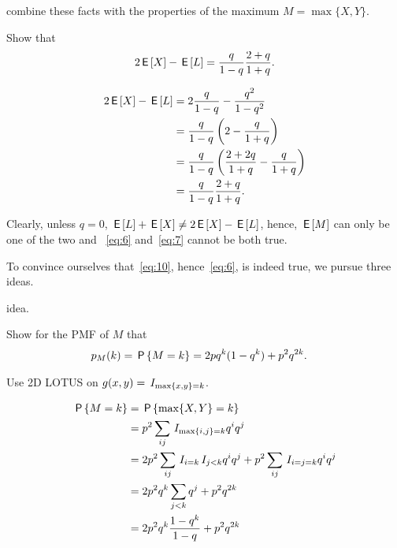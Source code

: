  combine these facts with the properties of the maximum $M=\max\{X, Y\}$.

\begin{exercise}
Show that
\begin{equation*}  \label{eq:10}
2\E X  -\E L = \frac q{1-q} \frac{2+q}{1+q}.
\end{equation*}
\begin{solution}
  \begin{align*}
2\E X - \E L
&= 2\frac q{1-q}  - \frac{q^2}{1-q^2}\\
&= \frac q{1-q}\left(2  - \frac{q}{1+q}\right)\\
&= \frac q{1-q}\left(\frac{2+2q}{1+q}  - \frac{q}{1+q}\right)\\
&= \frac q{1-q}\frac{2+q}{1+q}.
  \end{align*}
\end{solution}
\end{exercise}

Clearly, unless $q=0$, $\E L + \E X \neq 2\E X - \E L$, hence, $\E M$ can only be one of the two and ~\cref{eq:6} and~\cref{eq:7} cannot be both true.

To convince ourselves that~\cref{eq:10}, hence~\cref{eq:6}, is indeed true, we pursue  three ideas.

 idea.

\begin{exercise}\label{ex:1}
Show for the PMF of $M$ that
\begin{align*}
p_M(k) &= \P{M=k} = 2 pq^{k}(1-q^{k}) + p^2q^{2k}.
\end{align*}
\begin{hint}
  Use 2D LOTUS on $g(x,y) = \1{\max\{x, y\} = k}$.
\end{hint}
\begin{solution}
  \begin{align*}
\P{M=k}
&= \P{\max\{X, Y\} = k} \\
&=p^{2}\sum_{ij}\1{\max\{i,j\} =k} q^i q^j\\
&=2 p^{2}\sum_{ij}\1{i=k}\1{j < k} q^i q^j + p^{2}\sum_{ij}\1{i=j=k} q^{i} q^j \\
&=2 p^{2}q^{k}\sum_{j < k} q^j + p^{2}q^{2k}\\
&=2 p^{2}q^{k}\frac{1-q^{k}}{1-q} +  p^{2}q^{2k}\\
  \end{align*}
\end{solution}
\end{exercise}

